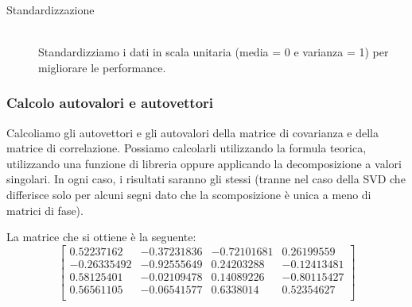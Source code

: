 \documentclass[12pt]{article}
\newcommand{\codice}[2]{}
\begin{document}
\begin{description}
				\item[Standardizzazione] \hfill \\
				Standardizziamo i dati in scala unitaria (media = 0 e varianza = 1) per migliorare le performance.
				\codice{58}{59}
			\end{description} 
		
		\subsubsection{Calcolo autovalori e autovettori}
		
			Calcoliamo gli autovettori e gli autovalori della matrice di covarianza e della matrice di correlazione. Possiamo calcolarli utilizzando la formula teorica, utilizzando una funzione di libreria oppure applicando la decomposizione a valori singolari. In ogni caso, i risultati saranno gli stessi (tranne nel caso della SVD che differisce solo per alcuni segni dato che la scomposizione è unica a meno di matrici di fase).
			\codice{61}{64}
			\codice{66}{94}
			La matrice che si ottiene è la seguente:
			$$\begin{bmatrix}
				0.52237162 & -0.37231836 & -0.72101681 & 0.26199559\\
				-0.26335492 & -0.92555649 & 0.24203288 & -0.12413481\\
				0.58125401 & -0.02109478 & 0.14089226 & -0.80115427\\
				0.56561105 & -0.06541577 & 0.6338014 & 0.52354627\\
			\end{bmatrix}$$
			
\end{document}
